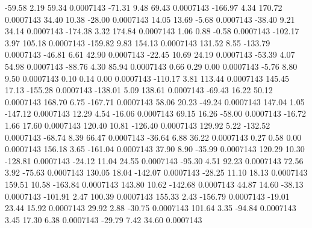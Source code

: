       -59.58        2.19       59.34     0.0007143
      -71.31        9.48       69.43     0.0007143
     -166.97        4.34      170.72     0.0007143
       34.40       10.38      -28.00     0.0007143
       14.05       13.69       -5.68     0.0007143
      -38.40        9.21       34.14     0.0007143
     -174.38        3.32      174.84     0.0007143
        1.06        0.88       -0.58     0.0007143
     -102.17        3.97      105.18     0.0007143
     -159.82        9.83      154.13     0.0007143
      131.52        8.55     -133.79     0.0007143
      -46.81        6.61       42.90     0.0007143
      -22.45       10.69       24.19     0.0007143
      -53.39        4.07       54.98     0.0007143
      -88.76        4.30       85.94     0.0007143
        0.66        0.29        0.00     0.0007143
       -5.76        8.80        9.50     0.0007143
        0.10        0.14        0.00     0.0007143
     -110.17        3.81      113.44     0.0007143
      145.45       17.13     -155.28     0.0007143
     -138.01        5.09      138.61     0.0007143
      -69.43       16.22       50.12     0.0007143
      168.70        6.75     -167.71     0.0007143
       58.06       20.23      -49.24     0.0007143
      147.04        1.05     -147.12     0.0007143
       12.29        4.54      -16.06     0.0007143
       69.15       16.26      -58.00     0.0007143
      -16.72        1.66       17.60     0.0007143
      120.40       10.81     -126.40     0.0007143
      129.92        5.22     -132.52     0.0007143
      -68.74        8.39       66.47     0.0007143
      -36.64        6.88       36.22     0.0007143
        0.27        0.58        0.00     0.0007143
      156.18        3.65     -161.04     0.0007143
       37.90        8.90      -35.99     0.0007143
      120.29       10.30     -128.81     0.0007143
      -24.12       11.04       24.55     0.0007143
      -95.30        4.51       92.23     0.0007143
       72.56        3.92      -75.63     0.0007143
      130.05       18.04     -142.07     0.0007143
      -28.25       11.10       18.13     0.0007143
      159.51       10.58     -163.84     0.0007143
      143.80       10.62     -142.68     0.0007143
       44.87       14.60      -38.13     0.0007143
     -101.91        2.47      100.39     0.0007143
      155.33        2.43     -156.79     0.0007143
      -19.01       23.44       15.92     0.0007143
       29.92        2.88      -30.75     0.0007143
      101.64        3.35      -94.84     0.0007143
        3.45       17.30        6.38     0.0007143
      -29.79        7.42       34.60     0.0007143
